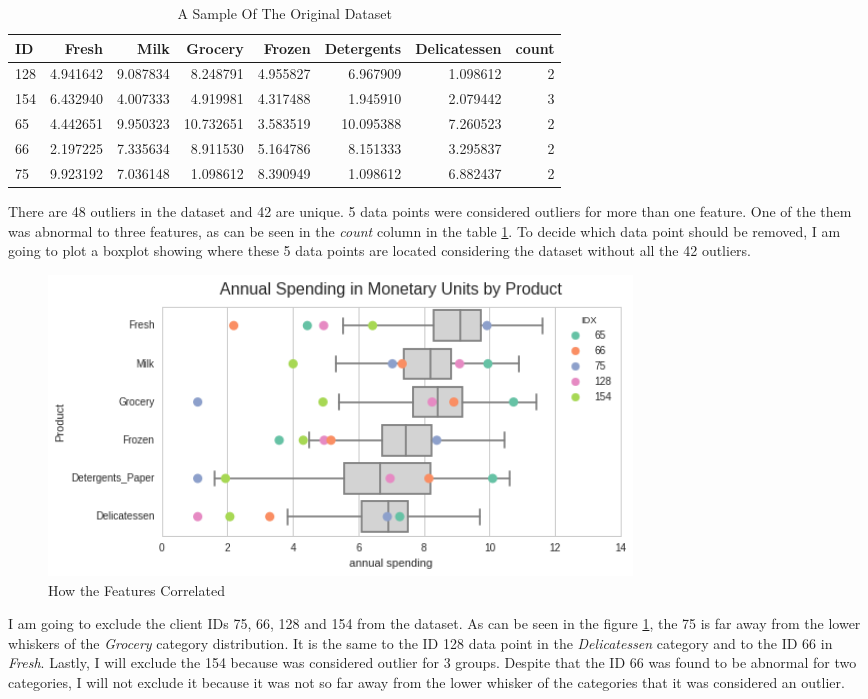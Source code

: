 \documentclass[a4paper]{article}
\begin{document}
\begin{table}[ht!]
\centering
\begin{tabular}{l|rrrrrrr}
{ID} &    Fresh &     Milk &  Grocery &    Frozen & Detergents & Delicatessen & count \\\hline
128 &  4.941642 &  9.087834 &   8.248791 &  4.955827 &          6.967909 &      1.098612 &      2 \\
154 &  6.432940 &  4.007333 &   4.919981 &  4.317488 &          1.945910 &      2.079442 &      3 \\
65  &  4.442651 &  9.950323 &  10.732651 &  3.583519 &         10.095388 &      7.260523 &      2 \\
66  &  2.197225 &  7.335634 &   8.911530 &  5.164786 &          8.151333 &      3.295837 &      2 \\
75  &  9.923192 &  7.036148 &   1.098612 &  8.390949 &          1.098612 &      6.882437 &      2 \\

\end{tabular}
\caption{\label{tab:outliers}A Sample Of The Original Dataset}
\end{table}

There are 48 outliers in the dataset and 42 are unique. 5 data points were considered outliers for more than one feature. One of the them was abnormal to three features, as can be seen in the \textit{count} column in the table \ref{tab:outliers}. To decide which data point should be removed, I am going to plot a boxplot showing where these 5 data points are located considering the dataset without all the 42 outliers.

\begin{figure}[ht!]
\centering
\includegraphics[width=0.75\textwidth]{figures/boxplot_features_log.png}
\caption{\label{fig:log_boxplot}How the Features Correlated}
\end{figure}

I am going to exclude the client IDs 75, 66, 128 and 154 from the dataset. As can be seen in the figure \ref{fig:log_boxplot}, the 75 is far away from the lower whiskers of the \textit{Grocery} category distribution. It is the same to the ID 128 data point in the \textit{Delicatessen} category and to the ID 66 in \textit{Fresh}. Lastly, I will exclude the 154 because was considered outlier for 3 groups. Despite that the ID 66 was found to be abnormal for two categories, I will not exclude it because it was not so far away from the lower whisker of the categories that it was considered an outlier.
\end{document}
